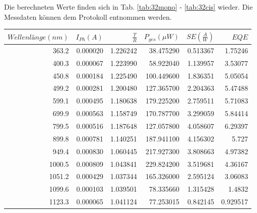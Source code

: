 Die berechneten Werte finden sich in Tab. \ref{tab:32mono} - \ref{tab:32cis} wieder. Die Messdaten können dem Protokoll entnommen werden.
\\

\begin{center}
\begin{tabular}{rrrrrr}
    $Wellenlänge (nm)$ &  $I_{Ph} (A)$ &    $\frac{T}{R}$ &  $P_{ges} (\mu W)$ &  $SE (\frac{A}{W})$ &       $EQE$ \\
    \hline
    363.2 &  0.000020 &  1.226242 &   38.475290 &  0.513367 &   1.75246 \\
    400.3 &  0.000067 &  1.223990 &   58.922040 &  1.139957 &   3.53077 \\
    450.8 &  0.000184 &  1.225490 &  100.449600 &  1.836351 &   5.05054 \\
    499.2 &  0.000281 &  1.200480 &  127.365700 &  2.204363 &   5.47488 \\
    599.1 &  0.000495 &  1.180638 &  179.225200 &  2.759511 &   5.71083 \\
    699.9 &  0.000563 &  1.158749 &  170.787700 &  3.299059 &   5.84414 \\
    799.5 &  0.000516 &  1.187648 &  127.057800 &  4.058607 &   6.29397 \\
    899.8 &  0.000781 &  1.140251 &  187.941100 &  4.156302 &     5.727 \\
    949.4 &  0.000830 &  1.060445 &  217.927300 &  3.808663 &   4.97382 \\
    1000.5 &  0.000809 &  1.043841 &  229.824200 &  3.519681 &   4.36167 \\
    1051.2 &  0.000429 &  1.037344 &  165.326000 &  2.595124 &   3.06083 \\
    1099.6 &  0.000103 &  1.039501 &   78.335660 &  1.315428 &    1.4832 \\
    1123.3 &  0.000065 &  1.041124 &   77.253015 &  0.842145 &  0.929517 \\
\end{tabular}
\label{tab:32mono}
\end{center}

